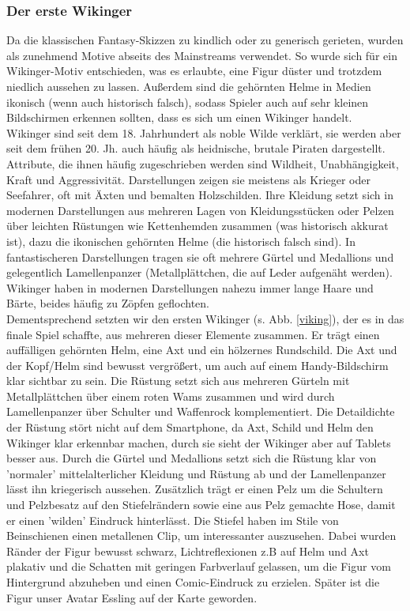 \documentclass[extern,palatino]{cgBA}
\begin{document}
\subsubsection{Der erste Wikinger}
Da die klassischen Fantasy-Skizzen zu kindlich oder zu generisch gerieten, wurden als zunehmend Motive abseits des Mainstreams verwendet. So wurde sich für ein Wikinger-Motiv entschieden, was es erlaubte, eine Figur düster und trotzdem niedlich aussehen zu lassen. Außerdem sind die gehörnten Helme in Medien ikonisch (wenn auch historisch falsch\cite{helm}), sodass Spieler auch auf sehr kleinen Bildschirmen erkennen sollten, dass es sich um einen Wikinger handelt.
\\Wikinger sind seit dem 18. Jahrhundert als noble Wilde verklärt, sie werden aber seit dem frühen 20. Jh. auch häufig als heidnische, brutale Piraten\cite{viki} dargestellt.%
Attribute, die ihnen häufig zugeschrieben werden sind Wildheit, Unabhängigkeit, Kraft und Aggressivität. Darstellungen zeigen sie meistens als Krieger oder Seefahrer, oft mit Äxten und bemalten Holzschilden. Ihre Kleidung setzt sich in modernen Darstellungen aus mehreren Lagen von Kleidungsstücken oder Pelzen über leichten Rüstungen wie Kettenhemden zusammen (was historisch akkurat ist), dazu die ikonischen gehörnten Helme (die historisch falsch sind). In fantastischeren Darstellungen tragen sie oft mehrere Gürtel und Medallions und gelegentlich Lamellenpanzer (Metallplättchen, die auf Leder aufgenäht werden). Wikinger haben in modernen Darstellungen nahezu immer lange Haare und Bärte, beides häufig zu Zöpfen geflochten. 
\\Dementsprechend setzten wir den ersten Wikinger (s. Abb. \ref{viking}), der es in das finale Spiel schaffte, aus mehreren dieser Elemente zusammen. Er trägt einen auffälligen gehörnten Helm, eine Axt und ein hölzernes Rundschild. Die Axt und der Kopf/Helm sind bewusst vergrößert, um auch auf einem Handy-Bildschirm klar sichtbar zu sein. Die Rüstung setzt sich aus mehreren Gürteln mit Metallplättchen über einem roten Wams zusammen und wird durch Lamellenpanzer über Schulter und Waffenrock komplementiert. Die Detaildichte der Rüstung stört nicht auf dem Smartphone, da Axt, Schild und Helm den Wikinger klar erkennbar machen, durch sie sieht der Wikinger aber auf Tablets besser aus. Durch die Gürtel und Medallions setzt sich die Rüstung klar von 'normaler' mittelalterlicher Kleidung und Rüstung ab und der Lamellenpanzer lässt ihn kriegerisch aussehen. Zusätzlich trägt er einen Pelz um die Schultern und Pelzbesatz auf den Stiefelrändern sowie eine aus Pelz gemachte Hose, damit er einen 'wilden' Eindruck hinterlässt. Die Stiefel haben im Stile von Beinschienen einen metallenen Clip, um interessanter auszusehen. Dabei wurden Ränder der Figur bewusst schwarz, Lichtreflexionen z.B auf Helm und Axt plakativ und die Schatten mit geringen Farbverlauf gelassen, um die Figur vom Hintergrund abzuheben und einen Comic-Eindruck zu erzielen. Später ist die Figur unser Avatar Essling auf der Karte geworden.
\end{document}
